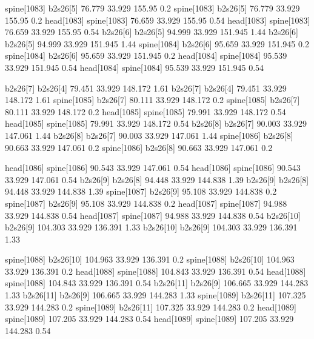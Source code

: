 spine[1083]    b2s26[5]    76.779    33.929    155.95    0.2
spine[1083]    b2s26[5]    76.779    33.929    155.95    0.2
head[1083]    spine[1083]    76.659    33.929    155.95    0.54
head[1083]    spine[1083]    76.659    33.929    155.95    0.54
b2s26[6]    b2s26[5]    94.999    33.929    151.945    1.44
b2s26[6]    b2s26[5]    94.999    33.929    151.945    1.44
spine[1084]    b2s26[6]    95.659    33.929    151.945    0.2
spine[1084]    b2s26[6]    95.659    33.929    151.945    0.2
head[1084]    spine[1084]    95.539    33.929    151.945    0.54
head[1084]    spine[1084]    95.539    33.929    151.945    0.54


b2s26[7]    b2s26[4]    79.451    33.929    148.172    1.61
b2s26[7]    b2s26[4]    79.451    33.929    148.172    1.61
spine[1085]    b2s26[7]    80.111    33.929    148.172    0.2
spine[1085]    b2s26[7]    80.111    33.929    148.172    0.2
head[1085]    spine[1085]    79.991    33.929    148.172    0.54
head[1085]    spine[1085]    79.991    33.929    148.172    0.54
b2s26[8]    b2s26[7]    90.003    33.929    147.061    1.44
b2s26[8]    b2s26[7]    90.003    33.929    147.061    1.44
spine[1086]    b2s26[8]    90.663    33.929    147.061    0.2
spine[1086]    b2s26[8]    90.663    33.929    147.061    0.2


head[1086]    spine[1086]    90.543    33.929    147.061    0.54
head[1086]    spine[1086]    90.543    33.929    147.061    0.54
b2s26[9]    b2s26[8]    94.448    33.929    144.838    1.39
b2s26[9]    b2s26[8]    94.448    33.929    144.838    1.39
spine[1087]    b2s26[9]    95.108    33.929    144.838    0.2
spine[1087]    b2s26[9]    95.108    33.929    144.838    0.2
head[1087]    spine[1087]    94.988    33.929    144.838    0.54
head[1087]    spine[1087]    94.988    33.929    144.838    0.54
b2s26[10]    b2s26[9]    104.303    33.929    136.391    1.33
b2s26[10]    b2s26[9]    104.303    33.929    136.391    1.33


spine[1088]    b2s26[10]    104.963    33.929    136.391    0.2
spine[1088]    b2s26[10]    104.963    33.929    136.391    0.2
head[1088]    spine[1088]    104.843    33.929    136.391    0.54
head[1088]    spine[1088]    104.843    33.929    136.391    0.54
b2s26[11]    b2s26[9]    106.665    33.929    144.283    1.33
b2s26[11]    b2s26[9]    106.665    33.929    144.283    1.33
spine[1089]    b2s26[11]    107.325    33.929    144.283    0.2
spine[1089]    b2s26[11]    107.325    33.929    144.283    0.2
head[1089]    spine[1089]    107.205    33.929    144.283    0.54
head[1089]    spine[1089]    107.205    33.929    144.283    0.54


